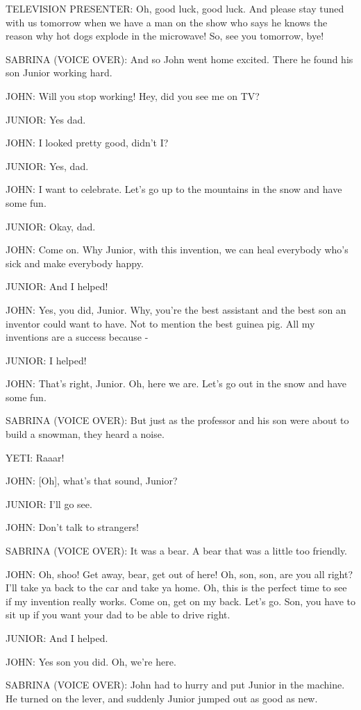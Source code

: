 TELEVISION PRESENTER:
Oh, good luck, good luck.
And please stay tuned with us tomorrow when we have a man on the show who says he knows the reason why hot dogs explode in the microwave!
So, see you tomorrow, bye!

SABRINA (VOICE OVER):
And so John went home excited.
There he found his son Junior working hard.

JOHN:
Will you stop working!
Hey, did you see me on TV?

JUNIOR:
Yes dad.

JOHN:
I looked pretty good, didn't I?

JUNIOR:
Yes, dad.

JOHN:
I want to celebrate.
Let's go up to the mountains in the snow and have some fun.

JUNIOR:
Okay, dad.

JOHN:
Come on.
Why Junior, with this invention, we can heal everybody who's sick and make everybody happy.

JUNIOR:
And I helped!

JOHN:
Yes, you did, Junior.
Why, you're the best assistant and the best son an inventor could want to have.
Not to mention the best guinea pig.
All my inventions are a success because -

JUNIOR:
I helped!

JOHN:
That's right, Junior.
Oh, here we are.
Let's go out in the snow and have some fun.

SABRINA (VOICE OVER):
But just as the professor and his son were about to build a snowman, they heard a noise.

YETI:
Raaar!

JOHN:
[Oh], what's that sound, Junior?

JUNIOR:
I'll go see.

JOHN:
Don't talk to strangers!

SABRINA (VOICE OVER):
It was a bear.
A bear that was a little too friendly.

JOHN:
Oh, shoo!
Get away, bear, get out of here!
Oh, son, son, are you all right?
I'll take ya back to the car and take ya home.
Oh, this is the perfect time to see if my invention really works.
Come on, get on my back.
Let's go.
Son, you have to sit up if you want your dad to be able to drive right.

JUNIOR:
And I helped.

JOHN:
Yes son you did.
Oh, we're here.

SABRINA (VOICE OVER):
John had to hurry and put Junior in the machine.
He turned on the lever, and suddenly Junior jumped out as good as new.


